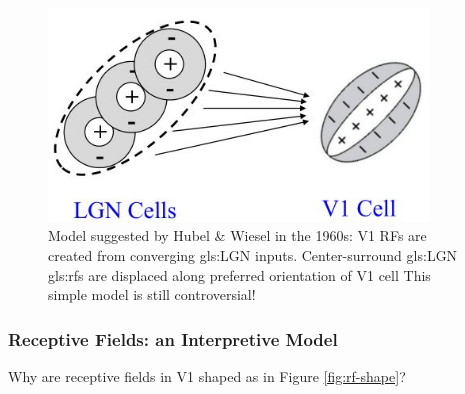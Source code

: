 \documentclass[]{article}
\begin{document}
\begin{figure}[H]
	\caption[Model suggested by Hubel \& Wiesel in the 	1960s]{Model suggested by 	Hubel \& Wiesel in the 	1960s: V1 RFs are created from converging 	\gls{gls:LGN} inputs. Center-surround \gls{gls:LGN} \glspl{gls:rf} are displaced along preferred orientation of V1 cell This simple model is still controversial!}
	\includegraphics[width=0.9\textwidth]{mech-rf-v1}
\end{figure}

\subsubsection{Receptive Fields: an Interpretive Model}
Why are receptive fields in V1 shaped as in Figure \ref{fig:rf-shape}?
\end{document}
